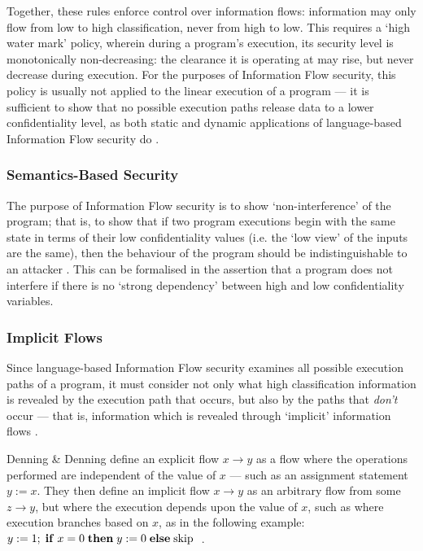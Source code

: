 Together, these rules enforce control over information flows: information may only flow from low to high classification, never from high to low. This requires a `high water mark' \cite{jones1975highwatermark} policy, wherein during a program's execution, its security level is monotonically non-decreasing: the clearance it is operating at may rise, but never decrease during execution. For the purposes of Information Flow security, this policy is usually not applied to the linear execution of a program --- it is sufficient to show that no possible execution paths release data to a lower confidentiality level, as both static and dynamic applications of language-based Information Flow security do \cite{sabelfeld2003if}.

\cite{denning1976lattice}

\cite{sandhu1994access}

\subsubsection{Semantics-Based Security}

The purpose of Information Flow security is to show `non-interference' of the program; that is, to show that if two program executions begin with the same state in terms of their low confidentiality values (i.e. the `low view' of the inputs are the same), then the behaviour of the program should be indistinguishable to an attacker \cite{sabelfeld2003if}. This can be formalised in the assertion that a program does not interfere if there is no `strong dependency' \cite{cohen1977declassification} between high and low confidentiality variables.

\subsubsection{Implicit Flows}

Since language-based Information Flow security examines all possible execution paths of a program, it must consider not only what high classification information is revealed by the execution path that occurs, but also by the paths that \textit{don't} occur --- that is, information which is revealed through `implicit' information flows \cite{sabelfeld2003if}.

Denning \& Denning \cite{denning1977if} define an explicit flow $ x \rightarrow y$ as a flow where the operations performed are independent of the value of $ x $ --- such as an assignment statement $ y := x $. They then define an implicit flow $ x \rightarrow y$ as an arbitrary flow from some $ z \rightarrow y $, but where the execution depends upon the value of $ x $, such as where execution branches based on $ x $, as in the following example: $ y := 1; \;\text{\textbf{if}}\; x = 0 \;\text{\textbf{then}}\; y := 0 \;\text{\textbf{else}}\; \text{skip}\;$ \cite{denning1977if}.

